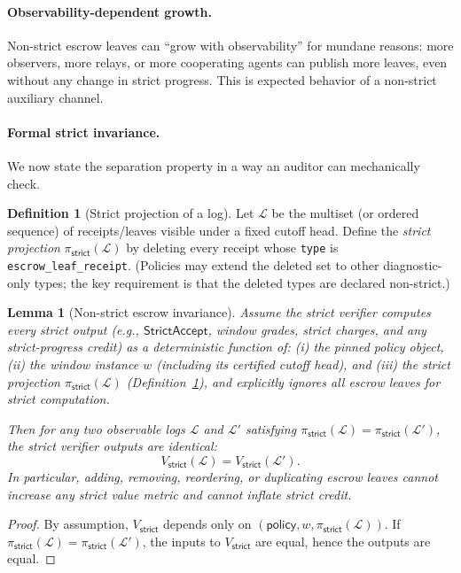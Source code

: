 \documentclass[11pt]{article}
\newcommand{\code}[1]{\texttt{#1}}
\newcommand{\1}{\mathbf{1}}
\theoremstyle{definition}
\newtheorem{definition}{Definition}
\theoremstyle{plain}
\newtheorem{lemma}{Lemma}
\begin{document}
\paragraph{Observability-dependent growth.}
Non-strict escrow leaves can ``grow with observability'' for mundane reasons: more observers, more relays, or more cooperating agents can publish more leaves, even without any change in strict progress.
This is expected behavior of a non-strict auxiliary channel.

\paragraph{Formal strict invariance.}
We now state the separation property in a way an auditor can mechanically check.

\begin{definition}[Strict projection of a log]
\label{def:strict_projection}
Let $\mathcal{L}$ be the multiset (or ordered sequence) of receipts/leaves visible under a fixed cutoff head.
Define the \emph{strict projection} $\pi_{\textsf{strict}}(\mathcal{L})$ by deleting every receipt whose \code{type} is \code{escrow\_leaf\_receipt}.
(Policies may extend the deleted set to other diagnostic-only types; the key requirement is that the deleted types are declared non-strict.)
\end{definition}

\begin{lemma}[Non-strict escrow invariance]
\label{lem:escrow_invariance}
Assume the strict verifier computes every strict output (e.g., $\mathsf{StrictAccept}$, window grades, strict charges, and any strict-progress credit) as a deterministic function of:
(i) the pinned policy object, (ii) the window instance $w$ (including its certified cutoff head), and (iii) the strict projection $\pi_{\textsf{strict}}(\mathcal{L})$ (Definition~\ref{def:strict_projection}),
and explicitly ignores all escrow leaves for strict computation.

Then for any two observable logs $\mathcal{L}$ and $\mathcal{L}'$ satisfying
$\pi_{\textsf{strict}}(\mathcal{L})=\pi_{\textsf{strict}}(\mathcal{L}')$,
the strict verifier outputs are identical:
\[
V_{\textsf{strict}}(\mathcal{L}) = V_{\textsf{strict}}(\mathcal{L}').
\]
In particular, adding, removing, reordering, or duplicating escrow leaves cannot increase any strict value metric and cannot inflate strict credit.
\end{lemma}

\begin{proof}
By assumption, $V_{\textsf{strict}}$ depends only on $(\textsf{policy},w,\pi_{\textsf{strict}}(\mathcal{L}))$.
If $\pi_{\textsf{strict}}(\mathcal{L})=\pi_{\textsf{strict}}(\mathcal{L}')$, the inputs to $V_{\textsf{strict}}$ are equal, hence the outputs are equal.
\end{proof}
\end{document}
